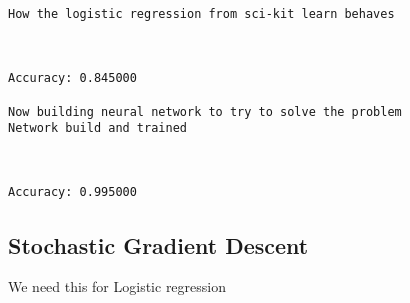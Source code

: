 \documentclass[11pt]{article}
\begin{document}
    \begin{Verbatim}[commandchars=\\\{\}]
How the logistic regression from sci-kit learn behaves

    \end{Verbatim}

    \begin{center}
    \end{center}
    { \hspace*{\fill} \\}
    
    \begin{Verbatim}[commandchars=\\\{\}]
Accuracy: 0.845000

Now building neural network to try to solve the problem
Network build and trained

    \end{Verbatim}

    \begin{center}
    \end{center}
    { \hspace*{\fill} \\}
    
    \begin{Verbatim}[commandchars=\\\{\}]
Accuracy: 0.995000

    \end{Verbatim}

    \subsection{Stochastic Gradient
Descent}\label{stochastic-gradient-descent}

We need this for Logistic regression
\end{document}
